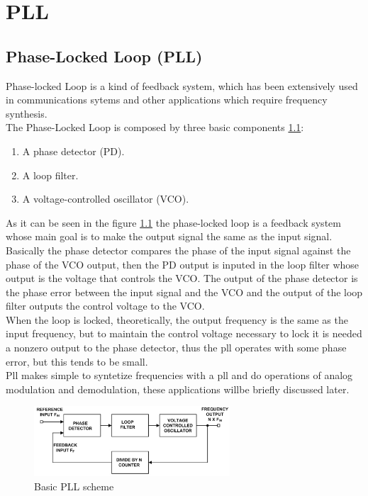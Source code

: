 \chapter{PLL}

\section{Phase-Locked Loop (PLL)}
\label{sec:pll}

Phase-locked Loop is a kind of feedback system, which has been extensively used
in communications sytems and other applications which require frequency
synthesis.\\
The Phase-Locked Loop is composed by three basic components \ref{fig:pll}:

\begin{enumerate}
    \item A phase detector (PD).
    \item A loop filter.
    \item A voltage-controlled oscillator (VCO).
\end{enumerate}

As it can be seen in the figure \ref{fig:pll} the phase-locked loop is a feedback
system whose main goal is to make the output signal the same as the input
signal. Basically the phase detector compares the phase of the input signal
against the phase of the VCO output, then the PD output is inputed in the loop
filter whose output is the voltage that controls the VCO. The output of the
phase detector is the phase error between the input signal and the VCO and the
output of the loop filter outputs the control voltage to the VCO.\\

When the loop is locked, theoretically, the output frequency is the same as the
input frequency, but to maintain the control voltage necessary to lock it is
needed a nonzero output to the phase detector, thus the pll operates with some
phase error, but this tends to be small.\\

Pll makes simple to syntetize frequencies with a pll and do operations
of analog modulation and demodulation, these applications willbe briefly
discussed later.


\begin{figure}[htbp]
    \centering
    \includegraphics[width=0.65\textwidth]{./figures/pll.eps}
    \caption{ Basic PLL scheme
    \label{fig:pll}}
\end{figure}


